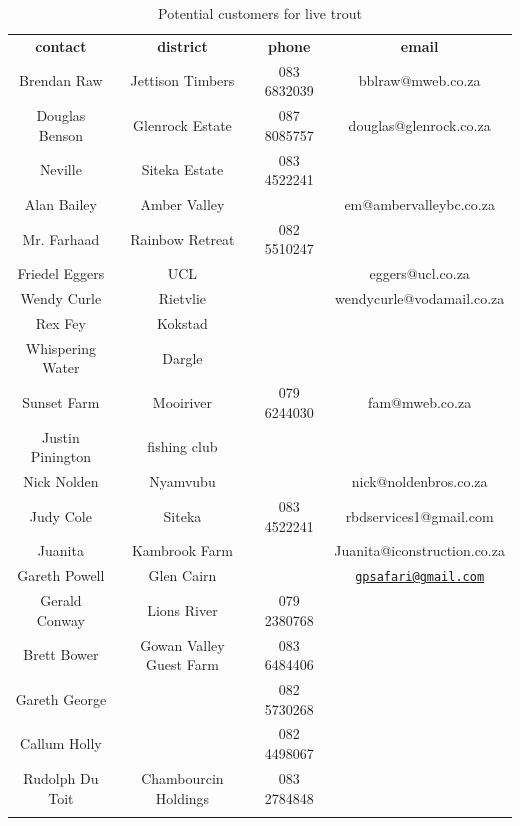 \begin{appendices}
\begin{table}[H]
  \centering
 \begin{tabular}{|c|c|c|c|}
 \thickhline
   {\bf contact} & {\bf district} & {\bf phone} & {\bf email}  \\ \thickhline
    Brendan Raw & Jettison Timbers & 083 6832039  & bblraw@mweb.co.za \\ \hline 
     Douglas Benson & Glenrock Estate & 087 8085757 & douglas@glenrock.co.za \\ \hline
     Neville & Siteka Estate & 083 4522241 & \\ \hline
    Alan Bailey & Amber Valley & & em@ambervalleybc.co.za\\ \hline
    Mr. Farhaad & Rainbow Retreat & 082 5510247 & \\ \hline
    Friedel Eggers & UCL &  & eggers@ucl.co.za \\ \hline
    Wendy Curle & Rietvlie &  & wendycurle@vodamail.co.za\\ \hline
    Rex Fey & Kokstad &  & \\ \hline
     Whispering Water & Dargle &  & \\ \hline
     Sunset Farm & Mooiriver & 079 6244030 & fam@mweb.co.za \\ \hline
     Justin Pinington & fishing club & & \\ \hline
      Nick Nolden & Nyamvubu & & nick@noldenbros.co.za \\ \hline
     Judy Cole & Siteka & 083 4522241 & rbdservices1@gmail.com \\ \hline
     Juanita & Kambrook Farm & & Juanita@iconstruction.co.za \\ \hline
     Gareth Powell & Glen Cairn & & \href{mailto:gpsafari@gmail.com}{\nolinkurl{gpsafari@gmail.com}} \\ \hline
     Gerald Conway & Lions River & 079 2380768 &  \\ \hline
     Brett Bower & Gowan Valley Guest Farm & 083 6484406 & \\ \hline
     Gareth George & & 082 5730268 & \\ \hline
     Callum Holly & & 082 4498067 & \\ \hline
     Rudolph Du Toit & Chambourcin Holdings & 083 2784848 & \\ \hline
     
                   \thickhline
  \end{tabular} 
  \caption{Potential customers for live trout}
  \label{tab:CustomerContactDetails}
\end{table}


\end{appendices}
